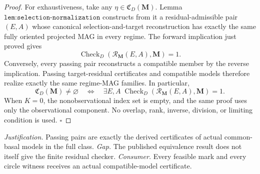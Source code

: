 \documentclass{article}
\begin{document}
\begin{proof}
For exhaustiveness, take any \(\eta\in\mathfrak C_D(\mathbf M)\).  Lemma \(\texttt{lem:selection-normalization}\) constructs from it a residual-admissible pair \((E,A)\) whose canonical selection-and-target reconstruction has exactly the same fully oriented projected MAG in every regime.  The forward implication just proved gives
\[
\operatorname{Check}_{D}(\mathcal R_{\mathbf M}(E,A),\mathbf M)=1.
\]
Conversely, every passing pair reconstructs a compatible member by the reverse implication.  Passing target-residual certificates and compatible models therefore realize exactly the same regime-MAG families.  In particular,
\[
\mathfrak C_D(\mathbf M)\ne\varnothing
\quad\Longleftrightarrow\quad
\exists E,A\;
\operatorname{Check}_{D}(\mathcal R_{\mathbf M}(E,A),\mathbf M)=1.
\]
When \(K=0\), the nonobservational index set is empty, and the same proof uses only the observational component.  No overlap, rank, inverse, division, or limiting condition is used. \(\square\)
\end{proof}
\par\smallskip\noindent \textit{Justification.} Passing pairs are exactly the derived certificates of actual common-basal models in the full class. \textit{Gap.} The published equivalence result does not itself give the finite residual checker. \textit{Consumer.} Every feasible mark and every circle witness receives an actual compatible-model certificate.
\end{document}
